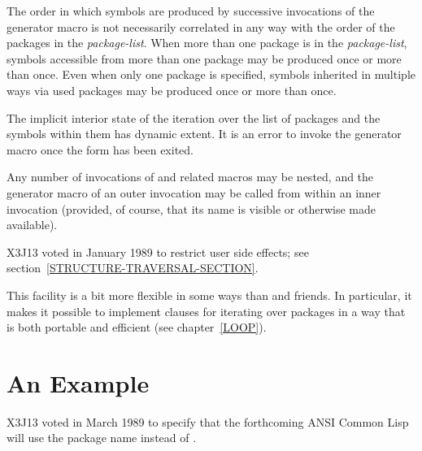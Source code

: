 \begin{new}
\begin{defmac}
The order in which symbols are produced by successive invocations
of the generator macro is not necessarily correlated in any way
with the order of the packages in the \emph{package-list}.
When more than one package is in the \emph{package-list},
symbols accessible from more than one package may be produced
once or more than once.  Even when only one package is specified,
symbols inherited in multiple ways via used packages may be
produced once or more than once.

The implicit interior state of the iteration over the list of packages
and the symbols within them has dynamic extent.
It is an error to invoke the generator macro
once the  form has been exited.

Any number of invocations of 
and related macros may be nested, and the generator macro of an
outer invocation may be called from within an inner invocation
(provided, of course, that its name is visible or otherwise made available).

X3J13 voted in January 1989
to restrict user side effects; see section~\ref{STRUCTURE-TRAVERSAL-SECTION}.

\beforenoterule
\begin{rationale}
This facility is a bit more flexible in some ways than 
and friends.
In particular, it makes it possible to implement 
clauses for iterating over packages in a way that is both portable
and efficient (see chapter~\ref{LOOP}).
\end{rationale}
\afternoterule
\end{defmac}
\end{new}

\section{An Example}
\label{PACKAGE-EXAMPLE-SECTION}

\begin{newer}
X3J13 voted in March 1989  to specify that
the forthcoming ANSI Common Lisp will use the package name 
instead of .
\end{newer}

